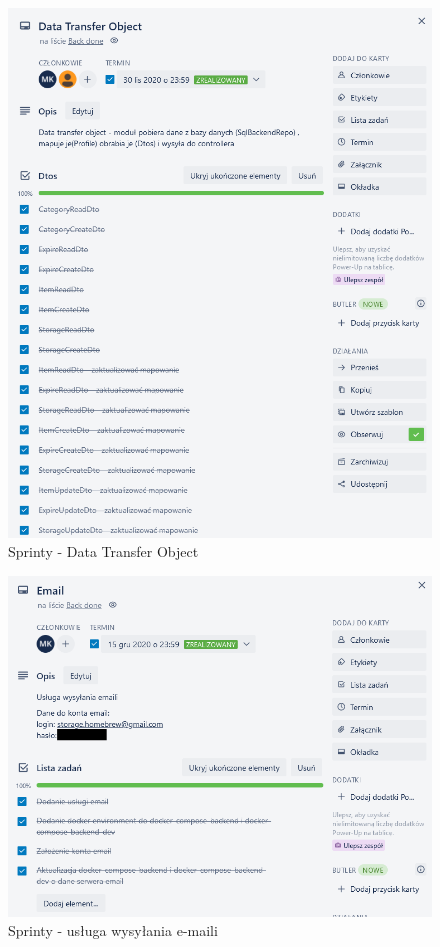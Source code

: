 \documentclass[12pt,a4paper]{article}
\begin{document}
				\begin{figure}[H]
			\centering
			\includegraphics[width=\textwidth]{img/DTO_Sprint.png}
			\caption{Sprinty - Data Transfer Object}
			\label{fig:sprint-dto}
		\end{figure}
		\begin{figure}[H]
			\centering
			\includegraphics[width=\textwidth]{img/Email_sprint.png}
			\caption{Sprinty - usługa wysyłania e-maili}
			\label{fig:sprint-email}
		\end{figure}
	\newpage
	
\end{document}
